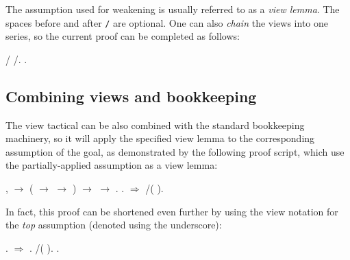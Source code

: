 \coqdocemptyline


The assumption  used for weakening is usually referred to as a
 \textit{view lemma}. The spaces before and after
\texttt{/} are optional. One can also \textit{chain} the views into one
series, so the current proof can be completed as follows:


\begin{coqdoccode}
\coqdocemptyline
\coqdocnoindent
{} / /.\coqdoceol
\coqdocnoindent
{}.\coqdoceol
\coqdocemptyline
\end{coqdoccode}


\subsection{Combining views and bookkeeping}




The view tactical can be also combined with the standard bookkeeping
machinery, so it will apply the specified view lemma to the
corresponding assumption of the goal, as demonstrated by the following
proof script, which use the partially-applied assumption   as a
view lemma:


\begin{coqdoccode}
\coqdocemptyline
\coqdocnoindent
{} \coqdockw{\ensuremath{\forall}}   ,  \ensuremath{\rightarrow} ( \ensuremath{\rightarrow}  \ensuremath{\rightarrow} ) \ensuremath{\rightarrow}  \ensuremath{\rightarrow} .\coqdoceol
\coqdocnoindent
{}.\coqdoceol
\coqdocnoindent
{} \ensuremath{\Rightarrow}     /( ).\coqdoceol
\coqdocemptyline
\end{coqdoccode}


In fact, this proof can be shortened even further by using the view
notation for the \textit{top} assumption (denoted using the underscore):


\begin{coqdoccode}
\coqdocemptyline
\coqdocnoindent
{}.\coqdoceol
\coqdocnoindent
{}\ensuremath{\Rightarrow}    .\coqdoceol
\coqdocnoindent
{} /(\coqdocvar{\_} ).\coqdoceol
\coqdocnoindent
{}.\coqdoceol
\coqdocemptyline
\end{coqdoccode}


